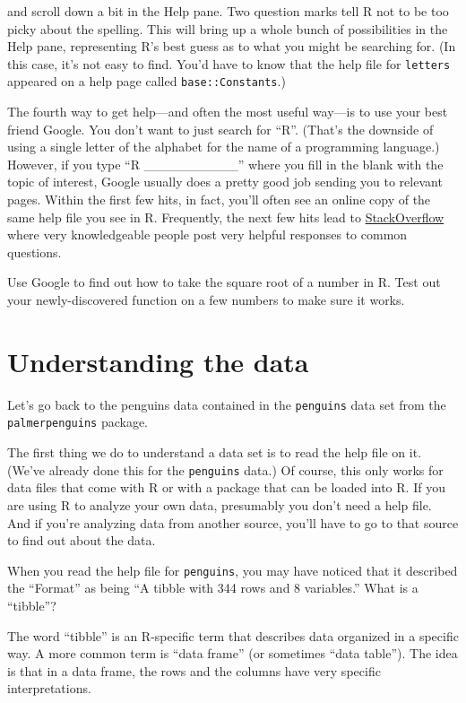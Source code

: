 \documentclass[
]{book}
\begin{document}
and scroll down a bit in the Help pane. Two question marks tell R not to be too picky about the spelling. This will bring up a whole bunch of possibilities in the Help pane, representing R's best guess as to what you might be searching for. (In this case, it's not easy to find. You'd have to know that the help file for \texttt{letters} appeared on a help page called \texttt{base::Constants}.)

The fourth way to get help---and often the most useful way---is to use your best friend Google. You don't want to just search for ``R''. (That's the downside of using a single letter of the alphabet for the name of a programming language.) However, if you type ``R \_\_\_\_\_\_\_\_\_\_'' where you fill in the blank with the topic of interest, Google usually does a pretty good job sending you to relevant pages. Within the first few hits, in fact, you'll often see an online copy of the same help file you see in R. Frequently, the next few hits lead to \href{https://stackoverflow.com}{StackOverflow} where very knowledgeable people post very helpful responses to common questions.

Use Google to find out how to take the square root of a number in R. Test out your newly-discovered function on a few numbers to make sure it works.

\hypertarget{intror-understandingdata}{%
\section{Understanding the data}\label{intror-understandingdata}}

Let's go back to the penguins data contained in the \texttt{penguins} data set from the \texttt{palmerpenguins} package.

The first thing we do to understand a data set is to read the help file on it. (We've already done this for the \texttt{penguins} data.) Of course, this only works for data files that come with R or with a package that can be loaded into R. If you are using R to analyze your own data, presumably you don't need a help file. And if you're analyzing data from another source, you'll have to go to that source to find out about the data.

When you read the help file for \texttt{penguins}, you may have noticed that it described the ``Format'' as being ``A tibble with 344 rows and 8 variables.'' What is a ``tibble''?

The word ``tibble'' is an R-specific term that describes data organized in a specific way. A more common term is ``data frame'' (or sometimes ``data table''). The idea is that in a data frame, the rows and the columns have very specific interpretations.
\end{document}
